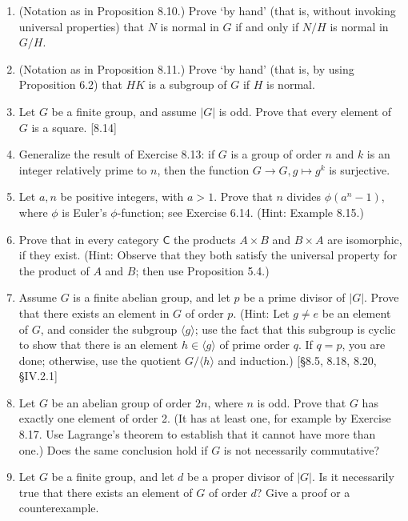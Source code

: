 \begin{enumerate}
    \item (Notation as in Proposition 8.10.) Prove `by hand' (that is, without invoking universal properties) that $N$ is normal in $G$ if and only if $N/H$ is normal in $G/H$.

    \item (Notation as in Proposition 8.11.) Prove `by hand' (that is, by using Proposition 6.2) that $HK$ is a subgroup of $G$ if $H$ is normal.

    \item Let $G$ be a finite group, and assume $|G|$ is odd. Prove that every element of $G$ is a square. [8.14]

    \item Generalize the result of Exercise 8.13: if $G$ is a group of order $n$ and $k$ is an integer relatively prime to $n$, then the function $G \to G, g \mapsto g^k$ is surjective.

    \item Let $a, n$ be positive integers, with $a>1$. Prove that $n$ divides $\phi(a^n-1)$, where $\phi$ is Euler's $\phi$-function; see Exercise 6.14. (Hint: Example 8.15.)

    \item Prove that in every category $\mathsf{C}$ the products $A \times B$ and $B \times A$ are isomorphic, if they exist. (Hint: Observe that they both satisfy the universal property for the product of $A$ and $B$; then use Proposition 5.4.)

    \item Assume $G$ is a finite abelian group, and let $p$ be a prime divisor of $|G|$. Prove that there exists an element in $G$ of order $p$. (Hint: Let $g \neq e$ be an element of $G$, and consider the subgroup $\langle g \rangle$; use the fact that this subgroup is cyclic to show that there is an element $h \in \langle g \rangle$ of prime order $q$. If $q=p$, you are done; otherwise, use the quotient $G/\langle h \rangle$ and induction.) [\S8.5, 8.18, 8.20, \S IV.2.1]

    \item Let $G$ be an abelian group of order $2n$, where $n$ is odd. Prove that $G$ has exactly one element of order 2. (It has at least one, for example by Exercise 8.17. Use Lagrange's theorem to establish that it cannot have more than one.) Does the same conclusion hold if $G$ is not necessarily commutative?

    \item Let $G$ be a finite group, and let $d$ be a proper divisor of $|G|$. Is it necessarily true that there exists an element of $G$ of order $d$? Give a proof or a counterexample.


\end{enumerate}
